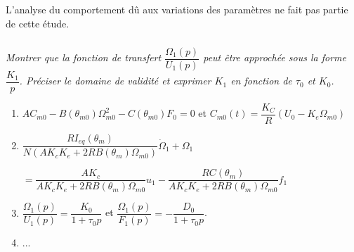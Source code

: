  \begin{rem}L’analyse du comportement dû aux variations des paramètres ne
fait pas partie de cette étude.
\end{rem}



\subparagraph{}
\textit{Montrer que la fonction de transfert $\dfrac{\Omega_1(p)}{U_1(p)}$ peut être approchée sous
la forme $\dfrac{K_1}{p}$. Préciser le domaine de validité et exprimer $K_1$ en fonction de $\tau_0$
et $K_0$.}
\ifprof
\begin{corrige}
\end{corrige}
\else
\fi


\begin{enumerate}
\item $AC_{m0}-B\left( \theta_{m0}\right) \Omega_{m0}^2-C\left( \theta_{m0}\right)F_0 = 0 $ et $C_{m0}(t)=\dfrac{K_C}{R}\left(U_0-K_e\Omega_{m0}\right)$
\item $\dfrac{RI_{eq}\left( \theta_m\right)}{N\left( AK_cK_e+2RB\left( \theta_m\right)\Omega_{m0}\right)} \dot{\Omega}_1+\Omega_1 $

 $= 
\dfrac{AK_c}{ AK_cK_e+2RB\left( \theta_m\right)\Omega_{m0}} u_1
- \dfrac{RC\left( \theta_m\right)}{ AK_cK_e+2RB\left( \theta_m\right)\Omega_{m0}} f_1$
\item $\dfrac{\Omega_1(p)}{U_1(p)}=\dfrac{K_0}{1+\tau_0 p}$ et $\dfrac{\Omega_1(p)}{F_1(p)}=-\dfrac{D_0}{1+\tau_0 p}$.
\item ...
\end{enumerate}
